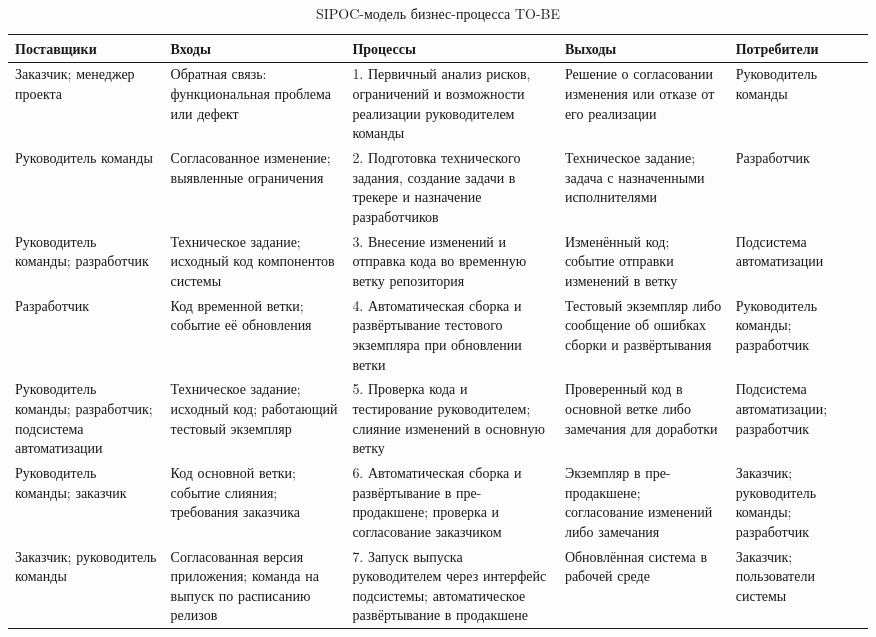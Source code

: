 \begin{landscape}
	\begin{table}[p]
		\centering
		\caption{SIPOC-модель бизнес-процесса TO-BE}\label{tab:sipoc-to-be}
		\footnotesize
		\setlength{\tabcolsep}{5pt}
		\renewcommand{\arraystretch}{1.15}
		\begin{tabularx}{\linewidth}{|Y{0.9}|Y{0.95}|Y{1.3}|Y{1.05}|Y{0.8}|}
			\hline
			\textbf{Поставщики} & \textbf{Входы} & \textbf{Процессы} & \textbf{Выходы} & \textbf{Потребители} \\
			\hline
			Заказчик; менеджер проекта &
			Обратная связь: функциональная проблема или дефект &
			1. Первичный анализ рисков, ограничений и возможности реализации руководителем команды &
			Решение о согласовании изменения или отказе от его реализации &
			Руководитель команды \\
			\hline
			Руководитель команды &
			Согласованное изменение; выявленные ограничения &
			2. Подготовка технического задания, создание задачи в трекере и назначение разработчиков &
			Техническое задание; задача с назначенными исполнителями &
			Разработчик \\
			\hline
			Руководитель команды; разработчик &
			Техническое задание; исходный код компонентов системы &
			3. Внесение изменений и отправка кода во временную ветку репозитория &
			Изменённый код; событие отправки изменений в ветку &
			Подсистема автоматизации \\
			\hline
			Разработчик &
			Код временной ветки; событие её обновления &
			4. Автоматическая сборка и развёртывание тестового экземпляра при обновлении ветки &
			Тестовый экземпляр либо сообщение об ошибках сборки и развёртывания &
			Руководитель команды; разработчик \\
			\hline
			Руководитель команды; разработчик; подсистема автоматизации &
			Техническое задание; исходный код; работающий тестовый экземпляр &
			5. Проверка кода и тестирование руководителем; слияние изменений в основную ветку &
			Проверенный код в основной ветке либо замечания для доработки &
			Подсистема автоматизации; разработчик \\
			\hline
			Руководитель команды; заказчик &
			Код основной ветки; событие слияния; требования заказчика &
			6. Автоматическая сборка и развёртывание в пре-продакшене; проверка и согласование заказчиком &
			Экземпляр в пре-продакшене; согласование изменений либо замечания &
			Заказчик; руководитель команды; разработчик \\
			\hline
			Заказчик; руководитель команды &
			Согласованная версия приложения; команда на выпуск по расписанию релизов &
			7. Запуск выпуска руководителем через интерфейс подсистемы; автоматическое развёртывание в продакшене &
			Обновлённая система в рабочей среде &
			Заказчик; пользователи системы \\
			\hline
		\end{tabularx}
	\end{table}
\end{landscape}

